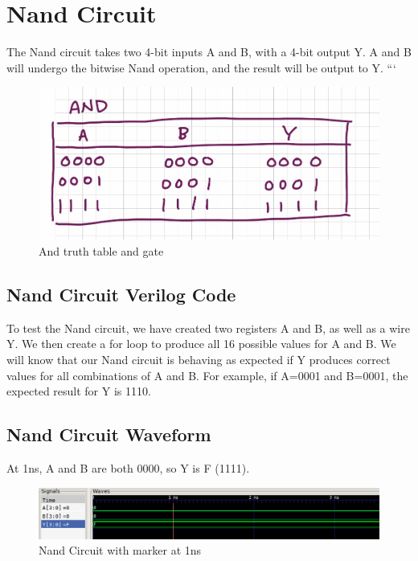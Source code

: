 \documentclass[12pt]{article}
\begin{document}
\section{Nand Circuit}

The Nand circuit takes two 4-bit inputs A and B, with a 4-bit output Y. A and B will undergo the bitwise Nand operation, and the result will be output to Y.
```\begin{figure}[H]
    \centering
    \includegraphics[width = 1.0\textwidth]{And/and-truth.jpeg}
    \caption{And truth table and gate}
    \label{fig:shift-table}
\end{figure}
\subsection{Nand Circuit Verilog Code} 
 

To test the Nand circuit, we have created two registers A and B, as well as a wire Y. We then create a for loop to produce all 16 possible values for A and B. We will know that our Nand circuit is behaving as expected if Y produces correct values for all combinations of A and B. For example, if A=0001 and B=0001, the expected result for Y is 1110. 
 

\subsection{Nand Circuit Waveform} 

At 1ns, A and B are both 0000, so Y is F (1111).
\begin{figure}[H]
 \centering
 \includegraphics[width = 1.0\textwidth]{Nand/nand_wave.png}
 \caption{Nand Circuit with marker at 1ns}
 \label{fig:enter-label} 
\end{figure} 
\end{document}
